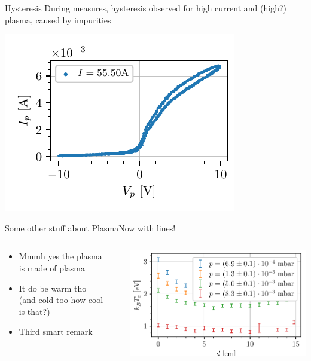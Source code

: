 \documentclass[10pt]{beamer}
\begin{document}
\begin{frame}{Hysteresis}
    During measures,
    hysteresis observed for high current and (high?) plasma, caused by impurities
    
    \includegraphics[scale=1]{../figures/hysteresis.pdf}

\end{frame}


\begin{frame}{Some other stuff about Plasma}{Now with lines!}
    \begin{columns}
    \begin{column}{0.49\textwidth}
        \begin{itemize}
            \item Mmmh yes the plasma is made of plasma
            \item It do be warm tho (and cold too how cool is that?)
            \item Third smart remark
        \end{itemize}
    \end{column}
    \begin{column}{.02\textwidth}
        \rule{.1mm}{0.7\textheight}
    \end{column}
    \begin{column}{0.49\textwidth}
        \includegraphics[width=\textwidth]{../figures/temperatureeV_position.pdf}
    \end{column}
    \end{columns}
\end{frame}
\end{document}
